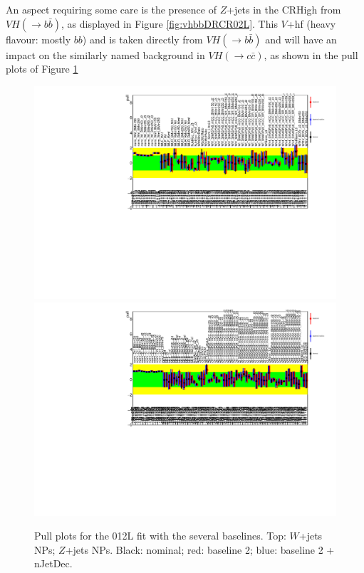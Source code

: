 
An aspect requiring some care is the presence of $Z$+jets in the CRHigh from $VH(\rightarrow b\bar{b})$, as displayed in Figure \ref{fig:vhbbDRCR02L}. This $V$+hf (heavy flavour: mostly $bb$) and  is taken directly from $VH(\rightarrow b\bar{b})$ and will have an impact on the similarly named background in $VH(\rightarrow c\bar{c})$, as shown in the pull plots of Figure \ref{fig:Vpulls}

\begin{figure}[h!]
\center
\includegraphics[scale=0.6]{Images/VH/pc3_v10_nomNjet_baseline2_nJetDecorr_012L/NP_Wjets.pdf}
\includegraphics[scale=0.6]{Images/VH/pc3_v10_nomNjet_baseline2_nJetDecorr_012L/NP_Zjets.pdf}\\
\caption{Pull plots for the 012L fit with the several baselines. Top: $W$+jets NPs; $Z$+jets NPs. Black: nominal; red: baseline 2; blue: baseline 2 + nJetDec.} 
\label{fig:Vpulls}
\end{figure}

